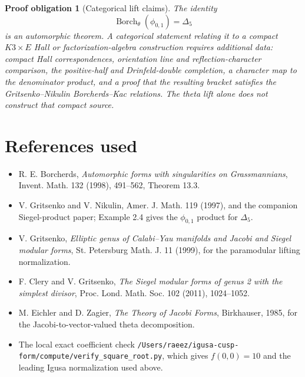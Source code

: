 \documentclass[11pt]{amsart}
\newtheorem{obligation}[theorem]{Proof obligation}
\newcommand{\phij}{\phi_{0,1}}
\newcommand{\Delfive}{\Delta_5}
\newcommand{\Bor}{\operatorname{Borch}_{\theta}}
\begin{document}
\begin{obligation}[Categorical lift claims]
\label{obl:categorical-lift}
The identity
\[
 \Bor(\phij)=\Delfive
\]
is an automorphic theorem.  A categorical statement relating it to a
compact \(K3\times E\) Hall or factorization-algebra construction
requires additional data: compact Hall correspondences, orientation
line and reflection-character comparison, the positive-half and
Drinfeld-double completion, a character map to the denominator product,
and a proof that the resulting bracket satisfies the Gritsenko--Nikulin
Borcherds--Kac relations.  The theta lift alone does not construct
that compact source.
\end{obligation}

\section{References used}

\begin{itemize}
\item R. E. Borcherds, \emph{Automorphic forms with singularities on
Grassmannians}, Invent. Math. 132 (1998), 491--562, Theorem 13.3.
\item V. Gritsenko and V. Nikulin, Amer. J. Math. 119 (1997), and the
companion Siegel-product paper; Example 2.4 gives the
\(\phij\) product for \(\Delfive\).
\item V. Gritsenko, \emph{Elliptic genus of Calabi--Yau manifolds and
Jacobi and Siegel modular forms}, St. Petersburg Math. J. 11 (1999),
for the paramodular lifting normalization.
\item F. Clery and V. Gritsenko, \emph{The Siegel modular forms of
genus 2 with the simplest divisor}, Proc. Lond. Math. Soc. 102
(2011), 1024--1052.
\item M. Eichler and D. Zagier, \emph{The Theory of Jacobi Forms},
Birkhauser, 1985, for the Jacobi-to-vector-valued theta decomposition.
\item The local exact coefficient check
\texttt{/Users/raeez/igusa-cusp-form/compute/verify\_square\_root.py},
which gives \(f(0,0)=10\) and the leading Igusa normalization used
above.
\end{itemize}
\end{document}
